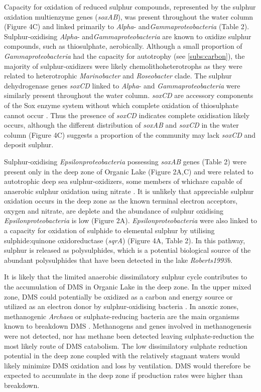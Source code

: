Capacity for oxidation of reduced sulphur compounds, represented by the sulphur oxidation multienzyme genes (\emph{soxAB}), was present throughout the water column (Figure 4C) and linked primarily to \emph{Alpha}- and\emph{Gammaproteobacteria} (Table 2). 
Sulphur-oxidising \emph{Alpha}- and\emph{Gammaproteobacteria} are known to oxidize sulphur compounds, such as thiosulphate, aerobically. 
Although a small proportion of \emph{Gammaproteobacteria} had the capacity for autotrophy 
(see \ref{subs:carbon}), 
the majority of sulphur-oxidizers were likely chemolithoheterotrophs as they were related to heterotrophic \emph{Marinobacter} and \emph{Roseobacter} clade. 
The sulphur dehydrogenase genes \emph{soxCD} linked to \emph{Alpha}- and \emph{Gammaproteobacteria} were similarly present throughout the water column. 
\emph{soxCD} are accessory components of the Sox enzyme system without which complete oxidation of thiosulphate cannot occur \cite{Friedrich2005}. 
Thus the presence of \emph{soxCD} indicates complete oxidisation likely occurs, although the different distribution of \emph{soxAB} and \emph{soxCD} in the water column (Figure 4C) suggests a proportion of the community may lack \emph{soxCD} and deposit sulphur. 

Sulphur-oxidising \emph{Epsilonproteobacteria} possessing \emph{soxAB} genes (Table 2) were present only in the deep zone of Organic Lake (Figure 2A,C) and were related to autotrophic deep sea sulphur-oxidizers, some members of whichare capable of anaerobic sulphur oxidation using nitrate \cite{Yamamoto2011}. 
It is unlikely that appreciable sulphur oxidation occurs in the deep zone as the known terminal electron acceptors, oxygen and nitrate, are deplete and the abundance of sulphur oxidising \emph{Epsilonproteobacteria} is low (Figure 2A). 
\emph{Epsilonproteobacteria} were also linked to a capacity for oxidation of sulphide to elemental sulphur by utilising sulphide:quinone oxidoreductase (\emph{sqrA}) (Figure 4A, Table 2). 
In this pathway, sulphur is released as polysulphides, which is a potential biological source of the abundant polysulphides that have been detected in the lake \emph{Roberts1993b}.

It is likely that the limited anaerobic dissimilatory sulphur cycle contributes to the accumulation of \ac{DMS} in Organic Lake in the deep zone.
 In the upper mixed zone, \ac{DMS} could potentially be oxidized as a carbon and energy source or utilized as an electron donor by sulphur-oxidising bacteria \cite{Schafer2010}. 
In anoxic zones, methanogenic \emph{Archaea} or sulphate-reducing bacteria are the main organisms known to breakdown \ac{DMS} \cite{Schafer2010}. 
Methanogens and genes involved in methanogenesis were not detected, nor has methane been detected \cite{Gibson1994} leaving sulphate-reduction the most likely route of \ac{DMS} catabolism. 
The low dissimilatory sulphate reduction potential in the deep zone coupled with the relatively stagnant waters would likely minimize \ac{DMS} oxidation and loss by ventilation. \ac{DMS} would therefore be expected to accumulate in the deep zone if production rates were higher than breakdown.

